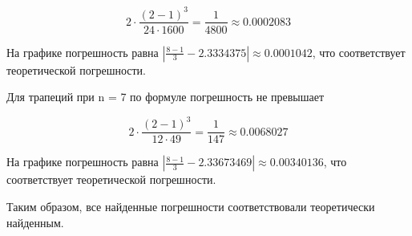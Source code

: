 \documentclass[12pt, a4paper]{report}
\begin{document}
	\[ 2 \cdot \frac{(2 - 1)^3}{24 \cdot 1600} = \frac{1}{4800} \approx 0.0002083\]
	
	На графике погрешность равна $\left| \frac{8 - 1}{3} - 2.3334375 \right| \approx 0.0001042$, что соответствует теоретической погрешности.
	
	Для трапеций при n = 7 по формуле погрешность не превышает
	
	\[ 2 \cdot \frac{(2 - 1)^3}{12 \cdot 49} = \frac{1}{147} \approx 0.0068027\]
	
	На графике погрешность равна $\left| \frac{8 - 1}{3} - 2.33673469 \right| \approx 0.00340136$, что соответствует теоретической погрешности.
	
	Таким образом, все найденные погрешности соответствовали теоретически найденным.
	
\end{document}

